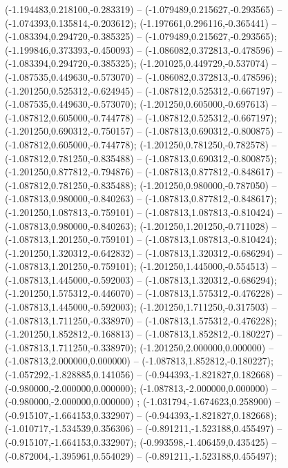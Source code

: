  (-1.194483,0.218100,-0.283319) -- (-1.079489,0.215627,-0.293565) -- (-1.074393,0.135814,-0.203612);
 (-1.197661,0.296116,-0.365441) -- (-1.083394,0.294720,-0.385325) -- (-1.079489,0.215627,-0.293565);
 (-1.199846,0.373393,-0.450093) -- (-1.086082,0.372813,-0.478596) -- (-1.083394,0.294720,-0.385325);
 (-1.201025,0.449729,-0.537074) -- (-1.087535,0.449630,-0.573070) -- (-1.086082,0.372813,-0.478596);
 (-1.201250,0.525312,-0.624945) -- (-1.087812,0.525312,-0.667197) -- (-1.087535,0.449630,-0.573070);
 (-1.201250,0.605000,-0.697613) -- (-1.087812,0.605000,-0.744778) -- (-1.087812,0.525312,-0.667197);
 (-1.201250,0.690312,-0.750157) -- (-1.087813,0.690312,-0.800875) -- (-1.087812,0.605000,-0.744778);
 (-1.201250,0.781250,-0.782578) -- (-1.087812,0.781250,-0.835488) -- (-1.087813,0.690312,-0.800875);
 (-1.201250,0.877812,-0.794876) -- (-1.087813,0.877812,-0.848617) -- (-1.087812,0.781250,-0.835488);
 (-1.201250,0.980000,-0.787050) -- (-1.087813,0.980000,-0.840263) -- (-1.087813,0.877812,-0.848617);
 (-1.201250,1.087813,-0.759101) -- (-1.087813,1.087813,-0.810424) -- (-1.087813,0.980000,-0.840263);
 (-1.201250,1.201250,-0.711028) -- (-1.087813,1.201250,-0.759101) -- (-1.087813,1.087813,-0.810424);
 (-1.201250,1.320312,-0.642832) -- (-1.087813,1.320312,-0.686294) -- (-1.087813,1.201250,-0.759101);
 (-1.201250,1.445000,-0.554513) -- (-1.087813,1.445000,-0.592003) -- (-1.087813,1.320312,-0.686294);
 (-1.201250,1.575312,-0.446070) -- (-1.087813,1.575312,-0.476228) -- (-1.087813,1.445000,-0.592003);
 (-1.201250,1.711250,-0.317503) -- (-1.087813,1.711250,-0.338970) -- (-1.087813,1.575312,-0.476228);
 (-1.201250,1.852812,-0.168813) -- (-1.087813,1.852812,-0.180227) -- (-1.087813,1.711250,-0.338970);
 (-1.201250,2.000000,0.000000) -- (-1.087813,2.000000,0.000000) -- (-1.087813,1.852812,-0.180227);
 (-1.057292,-1.828885,0.141056) -- (-0.944393,-1.821827,0.182668) -- (-0.980000,-2.000000,0.000000);
 (-1.087813,-2.000000,0.000000) -- (-0.980000,-2.000000,0.000000) ;
 (-1.031794,-1.674623,0.258900) -- (-0.915107,-1.664153,0.332907) -- (-0.944393,-1.821827,0.182668);
 (-1.010717,-1.534539,0.356306) -- (-0.891211,-1.523188,0.455497) -- (-0.915107,-1.664153,0.332907);
 (-0.993598,-1.406459,0.435425) -- (-0.872004,-1.395961,0.554029) -- (-0.891211,-1.523188,0.455497);
